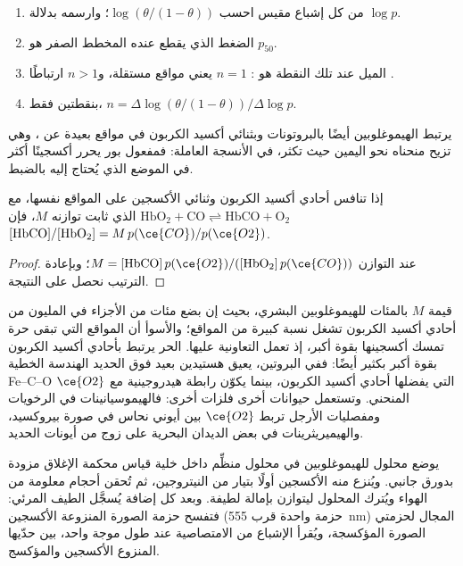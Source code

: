 \begin{method}\label{met:b3:bioinorganic:hill-plot}
\begin{enumerate}
  \item من كل إشباع مقيس احسب $\log(\theta/(1 - \theta))$؛ وارسمه بدلالة $\log p$.
  \item الضغط الذي يقطع عنده المخطط الصفر هو $p_{50}$.
  \item الميل عند تلك النقطة هو : $n = 1$ يعني مواقع
        مستقلة، و$n > 1$ ارتباطًا .
  \item بنقطتين فقط، $n = \Delta\log(\theta/(1 - \theta))/\Delta\log p$.
\end{enumerate}
\end{method}

يرتبط الهيموغلوبين أيضًا بالبروتونات وبثنائي أكسيد الكربون في مواقع بعيدة عن ،
وهي تزيح منحناه نحو اليمين حيث تكثر، في الأنسجة العاملة:
فمفعول بور يحرر أكسجينًا أكثر في الموضع الذي يُحتاج إليه بالضبط.

\begin{proposition}\label{prop:b3:bioinorganic:haldane}
إذا تنافس أحادي أكسيد الكربون وثنائي الأكسجين على المواقع نفسها، مع
$\mathrm{HbO_2 + CO \rightleftharpoons HbCO + O_2}$ الذي ثابت توازنه $M$، فإن
$[\mathrm{HbCO}]/[\mathrm{HbO_2}] = M\,p(\ce{CO})/p(\ce{O2})$.
\end{proposition}

\begin{proof}
عند التوازن $M = [\mathrm{HbCO}]\,p(\ce{O2})/([\mathrm{HbO_2}]\,p(\ce{CO}))$؛ وبإعادة الترتيب نحصل على النتيجة.
\end{proof}

قيمة $M$ بالمئات للهيموغلوبين البشري، بحيث إن بضع مئات من الأجزاء في
المليون من أحادي أكسيد الكربون تشغل نسبة كبيرة من المواقع؛ والأسوأ أن
المواقع التي تبقى حرة تمسك أكسجينها بقوة أكبر، إذ تعمل التعاونية
عليها.  الحر يرتبط بأحادي أكسيد الكربون بقوة أكبر بكثير أيضًا: ففي
البروتين، يعيق هستيدين بعيد فوق الحديد الهندسة الخطية Fe--C--O
التي يفضلها أحادي أكسيد الكربون، بينما يكوّن رابطة هيدروجينية مع $\ce{O2}$ المنحني.
وتستعمل حيوانات أخرى فلزات أخرى: فالهيموسيانينات في الرخويات ومفصليات الأرجل
تربط $\ce{O2}$ بين أيوني نحاس في صورة بيروكسيد، والهيميريثرينات في بعض الديدان
البحرية على زوج من أيونات الحديد.

\begin{inthelab}
يوضع محلول للهيموغلوبين في محلول منظِّم داخل خلية قياس محكمة الإغلاق مزودة
بدورق جانبي. ويُنزع منه الأكسجين أولًا بتيار من النيتروجين، ثم
تُحقن أحجام معلومة من الهواء ويُترك المحلول ليتوازن بإمالة
لطيفة. وبعد كل إضافة يُسجَّل الطيف المرئي: فتفسح حزمة
الصورة المنزوعة الأكسجين (حزمة واحدة قرب \qty{555}{nm}) المجال لحزمتي الصورة المؤكسجة،
ويُقرأ الإشباع من الامتصاصية عند طول موجة واحد، بين حدّيها
المنزوع الأكسجين والمؤكسج.
\end{inthelab}

